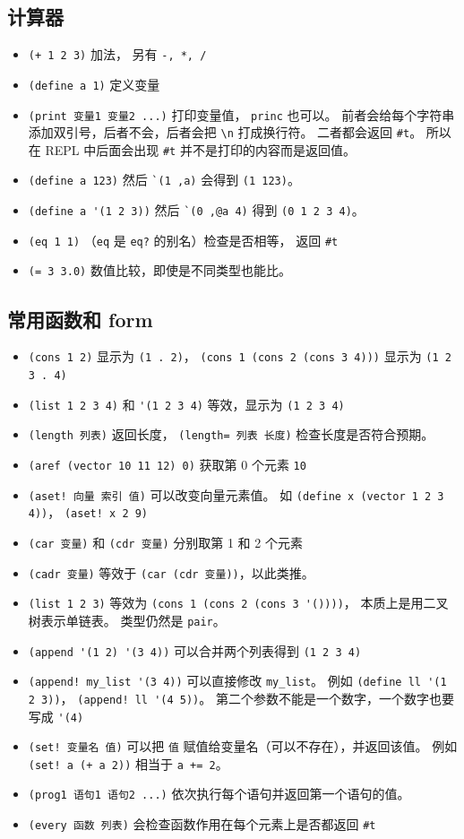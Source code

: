 \subsection{计算器}
\begin{itemize}
\item \verb`(+ 1 2 3)` 加法， 另有 \verb`-, *, /`
\item \verb`(define a 1)` 定义变量
\item \verb`(print 变量1 变量2 ...)` 打印变量值， \verb`princ` 也可以。 前者会给每个字符串添加双引号，后者不会，后者会把 \verb`\n` 打成换行符。 二者都会返回 \verb`#t`。 所以在 REPL 中后面会出现 \verb`#t` 并不是打印的内容而是返回值。
\item \verb`(define a 123)` 然后 \verb|`(1 ,a)| 会得到 \verb`(1 123)`。
\item \verb`(define a '(1 2 3))` 然后 \verb|`(0 ,@a 4)| 得到 \verb`(0 1 2 3 4)`。
\item \verb`(eq 1 1)` （\verb`eq` 是 \verb`eq?` 的别名）检查是否相等， 返回 \verb`#t`
\item \verb`(= 3 3.0)` 数值比较，即使是不同类型也能比。
\end{itemize}

\subsection{常用函数和 form}
\begin{itemize}
\item \verb`(cons 1 2)` 显示为 \verb`(1 . 2)`， \verb`(cons 1 (cons 2 (cons 3 4)))` 显示为 \verb`(1 2 3 . 4)`
\item \verb`(list 1 2 3 4)` 和 \verb`'(1 2 3 4)` 等效，显示为 \verb`(1 2 3 4)`
\item \verb`(length 列表)` 返回长度， \verb`(length= 列表 长度)` 检查长度是否符合预期。
\item \verb`(aref (vector 10 11 12) 0)` 获取第 0 个元素 \verb`10`
\item \verb`(aset! 向量 索引 值)` 可以改变向量元素值。 如 \verb`(define x (vector 1 2 3 4))`， \verb`(aset! x 2 9)`
\item \verb`(car 变量)` 和 \verb`(cdr 变量)` 分别取第 1 和 2 个元素
\item \verb`(cadr 变量)` 等效于 \verb`(car (cdr 变量))`，以此类推。
\item \verb`(list 1 2 3)` 等效为 \verb`(cons 1 (cons 2 (cons 3 '())))`， 本质上是用二叉树表示单链表。 类型仍然是 \verb`pair`。
\item \verb`(append '(1 2) '(3 4))` 可以合并两个列表得到 \verb`(1 2 3 4)`
\item \verb`(append! my_list '(3 4))` 可以直接修改 \verb`my_list`。 例如 \verb`(define ll '(1 2 3))`， \verb`(append! ll '(4 5))`。 第二个参数不能是一个数字，一个数字也要写成 \verb`'(4)`
\item \verb`(set! 变量名 值)` 可以把 \verb`值` 赋值给变量名（可以不存在），并返回该值。 例如 \verb`(set! a (+ a 2))` 相当于 \verb`a += 2`。
\item \verb`(prog1 语句1 语句2 ...)` 依次执行每个语句并返回第一个语句的值。
\item \verb`(every 函数 列表)` 会检查函数作用在每个元素上是否都返回 \verb`#t`
\end{itemize}


